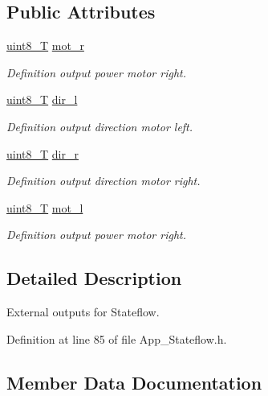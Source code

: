 \subsection*{Public Attributes}
\begin{DoxyCompactItemize}
\item 
\mbox{\hyperlink{_app___stateflowtypes_8h_a2532a6244e023eee49f315c10f1f7c53}{uint8\+\_\+T}} \mbox{\hyperlink{struct_ext_y_aa589c8750c337a99456c3e29975ec7fb}{mot\+\_\+r}}
\begin{DoxyCompactList}\small\item\em Definition output power motor right. \end{DoxyCompactList}\item 
\mbox{\hyperlink{_app___stateflowtypes_8h_a2532a6244e023eee49f315c10f1f7c53}{uint8\+\_\+T}} \mbox{\hyperlink{struct_ext_y_a95dca3013d0094be95ffd4af4d1a645e}{dir\+\_\+l}}
\begin{DoxyCompactList}\small\item\em Definition output direction motor left. \end{DoxyCompactList}\item 
\mbox{\hyperlink{_app___stateflowtypes_8h_a2532a6244e023eee49f315c10f1f7c53}{uint8\+\_\+T}} \mbox{\hyperlink{struct_ext_y_abe09271200dc96e32093a19312a23686}{dir\+\_\+r}}
\begin{DoxyCompactList}\small\item\em Definition output direction motor right. \end{DoxyCompactList}\item 
\mbox{\hyperlink{_app___stateflowtypes_8h_a2532a6244e023eee49f315c10f1f7c53}{uint8\+\_\+T}} \mbox{\hyperlink{struct_ext_y_a20f11c28f5b2d9f4a24766c4d56678e9}{mot\+\_\+l}}
\begin{DoxyCompactList}\small\item\em Definition output power motor right. \end{DoxyCompactList}\end{DoxyCompactItemize}


\subsection{Detailed Description}
External outputs for Stateflow. 

Definition at line 85 of file App\+\_\+\+Stateflow.\+h.



\subsection{Member Data Documentation}
\mbox{\label{struct_ext_y_a95dca3013d0094be95ffd4af4d1a645e}} 
